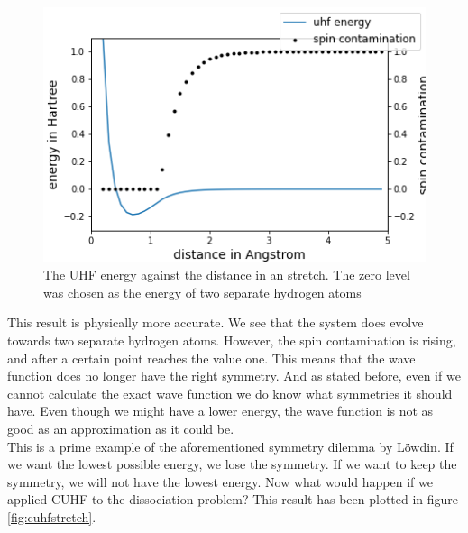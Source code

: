 \documentclass[twoside,twocolumn,9pt]{article}
\begin{document}
\begin{center}
  \begin{figure}[h]
    \includegraphics[width=\linewidth]{./../notes/figures/uhf.png}
    \caption{The UHF energy against the distance in an  stretch. The zero level was chosen as the energy of two separate hydrogen atoms}
    \label{fig:uhfstretch}
  \end{figure}
\end{center}

This result is physically more accurate. We see that the system does evolve towards two separate hydrogen atoms. However, the spin contamination is rising, and after a certain point
reaches the value one. This means that the wave function does no longer have the right symmetry. And as stated before, even if we cannot calculate the exact wave function we do know
what symmetries it should have. Even though we might have a lower energy, the wave function is not as good as an approximation as it could be\cite{Scuseria2013}. \\
This is a prime example of the aforementioned symmetry dilemma by Löwdin. If we want the lowest possible energy, we lose the symmetry. If we want to keep the symmetry, we will not
have the lowest energy. Now what would happen if we applied CUHF to the dissociation problem? This result has been plotted in figure \ref{fig:cuhfstretch}.
\end{document}

